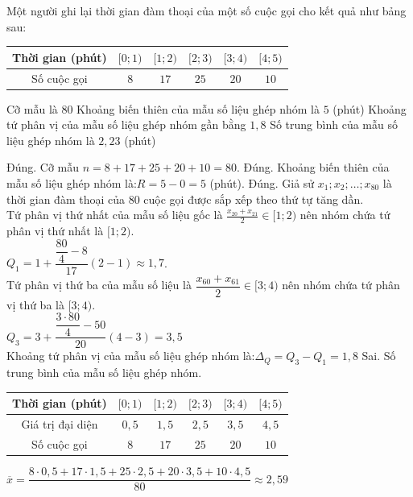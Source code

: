 \begin{ex}%
	Một người ghi lại thời gian đàm thoại của một số cuộc gọi cho kết quả như bảng sau:
	
	\begin{tabular}{|c|c|c|c|c| c|}
		\hline
		Thời gian (phút) & $[0;1)$  & $[1;2)$  & $[2;3)$  & $[3;4)$  & $[4;5)$   \\
		\hline
		Số cuộc gọi    & $8$  & $17$ & $25$ & $20$  & $10$  \\
		\hline
	\end{tabular}
	\choiceTF
	{\True Cỡ mẫu là $80$}
	{\True Khoảng biến thiên của mẫu số liệu ghép nhóm là $5$ (phút)}
	{\True Khoảng tứ phân vị của mẫu số liệu ghép nhóm gần bằng $1{,}8$}
	{Số trung bình của mẫu số liệu ghép nhóm là $2{,}23$ (phút)}
	\loigiai
	{
		\begin{itemchoice}
			\itemch Đúng. Cỡ mẫu $n = 8 + 17 + 25 + 20 + 10 = 80$.
			\itemch Đúng. Khoảng biến thiên của mẫu số liệu ghép nhóm là:$R = 5 - 0 = 5$   (phút).
			\itemch Đúng. Giả sử $x_1; x_2; …; x_{80}$ là thời gian đàm thoại của $80$ cuộc gọi được sắp xếp theo thứ tự tăng dần.\\
			Tứ phân vị thứ nhất của mẫu số liệu gốc là  $\frac{x_{20} + x_{21}}{2} \in  [1; 2)$ nên nhóm chứa tứ phân vị thứ nhất là $[1; 2)$.\\
			${Q_1} = 1 + \dfrac{{\dfrac{80}{4} - 8}}{17}( 2 - 1 ) \approx 1{,}7$.\\
			Tứ phân vị thứ ba của mẫu số liệu là $\dfrac{{x_{60} + x_{61}}}{2} \in   [3; 4)$ nên nhóm chứa tứ phân vị thứ ba là $[3; 4)$.\\
			${Q_3} = 3 + \dfrac{{\dfrac{3\cdot80}{4} - 50}}{20}( 4 - 3) = 3{,}5$\\
			Khoảng tứ phân vị của mẫu số liệu ghép nhóm là:${\Delta _Q} = {Q_3} - {Q_1} = 1,8$  
			\itemch Sai. Số trung bình của mẫu số liệu ghép nhóm.\\
			\begin{tabular}{|c|c|c|c|c| c|}
				\hline
				Thời gian (phút) & $[0;1)$  & $[1;2)$  & $[2;3)$  & $[3;4)$  & $[4;5)$   \\
				\hline
				Giá trị đại diện    & $0{,}5$  & $1{,}5$ & $2{,}5$ & $3{,}5$  & $4{,}5$  \\
				\hline
				Số cuộc gọi    & $8$  & $17$ & $25$ & $20$  & $10$  \\
				\hline
			\end{tabular}
			
			$\overline x  = \dfrac{{8\cdot0{,}5 + 17\cdot1{,}5 + 25\cdot2{,}5 + 20\cdot3{,}5 + 10\cdot4{,}5}}{{80}} \approx 2{,}59$
		\end{itemchoice}
	}
\end{ex}


